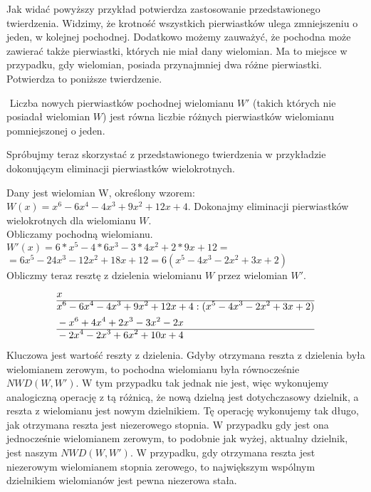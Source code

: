 Jak widać powyższy przykład potwierdza zastosowanie przedstawionego twierdzenia. Widzimy, że krotność wszystkich pierwiastków ulega zmniejszeniu o jeden, w kolejnej pochodnej. Dodatkowo możemy zauważyć, że pochodna może zawierać także pierwiastki, których nie miał dany wielomian. Ma to miejsce w przypadku, gdy wielomian, posiada przynajmniej dwa różne pierwiastki. Potwierdza to poniższe twierdzenie.

\begin{theorem}
	$ $
	Liczba nowych pierwiastków pochodnej wielomianu $W'$ (takich których nie posiadał wielomian $W$) jest równa liczbie różnych pierwiastków wielomianu pomniejszonej o jeden.
\end{theorem}

Spróbujmy teraz skorzystać z przedstawionego twierdzenia w przykładzie dokonującym eliminacji pierwiastków wielokrotnych.

\begin{example}
	$ $ \\
	Dany jest wielomian W, określony wzorem: $W(x)=x^6-6x^4-4x^3+9x^2+12x+4$. Dokonajmy eliminacji pierwiastków wielokrotnych dla wielomianu $W$. \\
	Obliczamy pochodną wielomianu. \\
	$W'(x)=6*x^5-4*6x^3-3*4x^2+2*9x+12=$ \\
	$=6x^5-24x^3-12x^2+18x+12=6(x^5-4x^3-2x^2+3x+2)$ \\
	Obliczmy teraz resztę z dzielenia wielomianu $W$ przez wielomian $W'$.
	\begin{equation}
	\begin{split}
	&x\\\hline
	&x^6-6x^4-4x^3+9x^2+12x+4 : (x^5-4x^3-2x^2+3x+2) \\
	&-x^6+4x^4+2x^3-3x^2-2x \\\hline
	&-2x^4-2x^3+6x^2+10x+4 \\
	\end{split}
	\end{equation}
	Kluczowa jest wartość reszty z dzielenia. Gdyby otrzymana reszta z dzielenia była wielomianem zerowym, to pochodna wielomianu była równocześnie $NWD(W, W')$. W tym przypadku tak jednak nie jest, więc wykonujemy analogiczną operację z tą różnicą, że nową dzielną jest dotychczasowy dzielnik, a reszta z wielomianu jest nowym dzielnikiem. Tę operację wykonujemy tak długo, jak otrzymana reszta jest niezerowego stopnia. W przypadku gdy jest ona jednocześnie wielomianem zerowym, to podobnie jak wyżej, aktualny dzielnik, jest naszym $NWD(W, W')$. W przypadku, gdy otrzymana reszta jest niezerowym wielomianem stopnia zerowego, to największym wspólnym dzielnikiem wielomianów jest pewna niezerowa stała.
\end{example}

